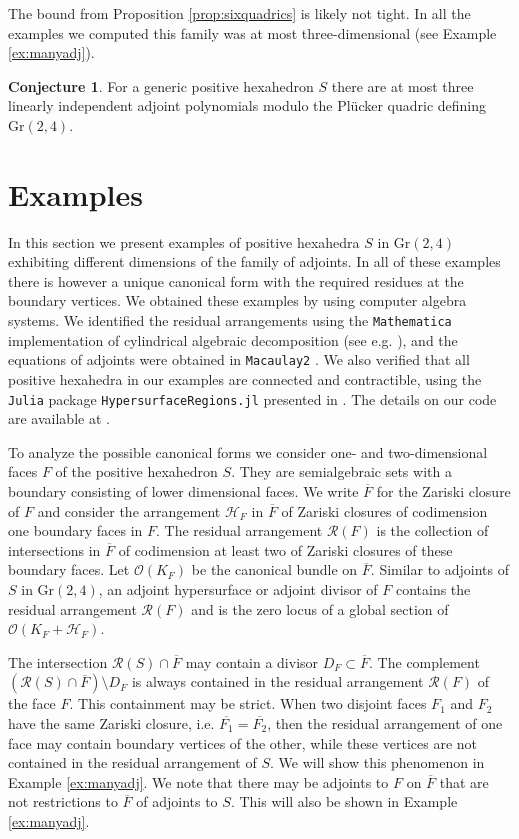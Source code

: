 \documentclass[12pt]{extarticle}
\theoremstyle{definition}
\newtheorem{conjecture}[theorem]{Conjecture}
\begin{document}
The bound from Proposition \ref{prop:sixquadrics} is likely not tight. In all the examples we computed this family was at most three-dimensional (see Example \ref{ex:manyadj}).

\begin{conjecture}
For a generic positive hexahedron $S$ there are at most three linearly independent adjoint polynomials modulo the Pl\"ucker quadric defining $\mathrm{Gr}(2,4)$.
\end{conjecture}

\section{Examples} \label{sec:5}
In this section we present examples of positive hexahedra $S$ in $\mathrm{Gr}(2,4)$ exhibiting different dimensions of the family of adjoints. In all of these examples there is however a unique canonical form with the required residues at the boundary vertices. We obtained these examples by using computer algebra systems. We identified the residual arrangements using the \texttt{Mathematica} implementation of cylindrical algebraic decomposition (see e.g. \cite{arnon1984cylindrical}), and the equations of adjoints were obtained in \texttt{Macaulay2} \cite{M2}. We also verified that all positive hexahedra in our examples are connected and contractible, using the \texttt{Julia} package \texttt{HypersurfaceRegions.jl} presented in \cite{breiding2024computing}. The details on our code are available at \cite{mathrepo}. 

To analyze the possible canonical forms we consider one- and two-dimensional faces $F$ of the positive hexahedron $S$. They are semialgebraic sets with a boundary consisting of lower dimensional faces. We write $\overline{F}$ for the Zariski closure of $F$ and consider the arrangement ${\mathcal H}_F$ in $\overline{F}$ of Zariski closures of codimension one boundary faces in $F$. The residual arrangement $\mathcal{R}(F)$ is the collection of intersections in $\overline{F}$ of codimension at least two of Zariski closures of these boundary faces. Let ${\mathcal O}(K_F)$ be the canonical bundle on $\overline{F}$.  Similar to adjoints of $S$ in $\mathrm{Gr}(2,4)$, an adjoint hypersurface or adjoint divisor of $F$ contains the residual arrangement  $\mathcal{R}(F)$ and is the zero locus of a global section of ${\mathcal O}(K_F+{\mathcal H}_F)$. 

The intersection $\mathcal{R}(S)\cap \overline{F}$ may contain a divisor $D_F\subset \overline{F}$. The complement $(\mathcal{R}(S)\cap \overline{F})\setminus D_F$ is always contained in the residual arrangement $\mathcal{R}(F)$ of the face $F$. 
This containment may be strict.
When two disjoint faces $F_1$ and $F_2$ have the same Zariski closure, i.e. $\overline{F_1}=\overline{F_2}$, then the residual arrangement of one face may contain boundary vertices of the other, while these vertices are not contained in the residual arrangement of $S$. We will show this phenomenon in Example \ref{ex:manyadj}. 
We note that there may be adjoints to $F$ on $\overline{F}$ that are not restrictions to $\overline{F}$ of adjoints to $S$. This will also be shown in Example \ref{ex:manyadj}. 
\end{document}

